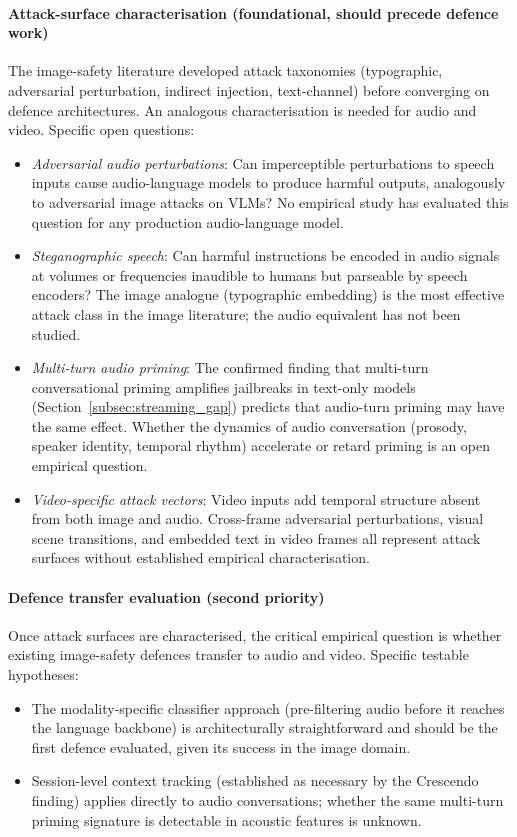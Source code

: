 \paragraph{Attack-surface characterisation (foundational, should precede defence work)}
The image-safety literature developed attack taxonomies (typographic, adversarial
perturbation, indirect injection, text-channel) before converging on defence
architectures.
An analogous characterisation is needed for audio and video.
Specific open questions:
\begin{itemize}
  \item \textit{Adversarial audio perturbations}: Can imperceptible perturbations
        to speech inputs cause audio-language models to produce harmful outputs,
        analogously to adversarial image attacks on VLMs?
        No empirical study has evaluated this question for any production
        audio-language model.
  \item \textit{Steganographic speech}: Can harmful instructions be encoded in
        audio signals at volumes or frequencies inaudible to humans but
        parseable by speech encoders?
        The image analogue (typographic embedding) is the most effective attack
        class in the image literature; the audio equivalent has not been studied.
  \item \textit{Multi-turn audio priming}: The confirmed finding that multi-turn
        conversational priming amplifies jailbreaks in text-only models
        (Section~\ref{subsec:streaming_gap}) predicts that audio-turn priming
        may have the same effect.
        Whether the dynamics of audio conversation (prosody, speaker identity,
        temporal rhythm) accelerate or retard priming is an open empirical
        question.
  \item \textit{Video-specific attack vectors}: Video inputs add temporal
        structure absent from both image and audio.
        Cross-frame adversarial perturbations, visual scene transitions, and
        embedded text in video frames all represent attack surfaces without
        established empirical characterisation.
\end{itemize}

\paragraph{Defence transfer evaluation (second priority)}
Once attack surfaces are characterised, the critical empirical question is whether
existing image-safety defences transfer to audio and video.
Specific testable hypotheses:
\begin{itemize}
  \item The modality-specific classifier approach (pre-filtering audio before it
        reaches the language backbone) is architecturally straightforward and
        should be the first defence evaluated, given its success in the image
        domain.
  \item Session-level context tracking (established as necessary by the Crescendo
        finding) applies directly to audio conversations; whether the same
        multi-turn priming signature is detectable in acoustic features is
        unknown.
\end{itemize}

